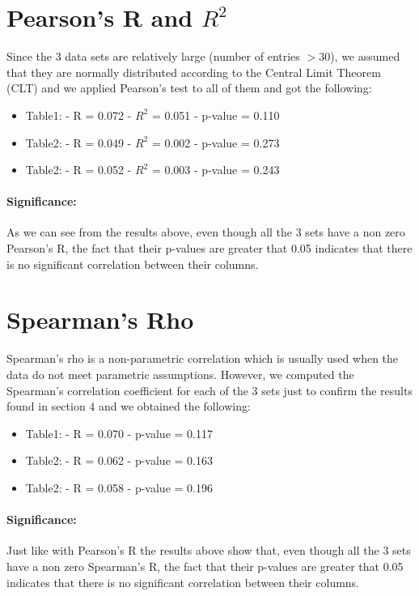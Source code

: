 \documentclass[12pt]{article}
\begin{document}
	\section{Pearson's R and $R^2$}
		Since the 3 data sets are relatively large (number of entries $> 30$), we assumed that they are normally distributed according to the Central Limit Theorem (CLT) and we applied Pearson's test to all of them and got the following:
		\begin{itemize} 
			\item Table1: 
				\subitem - R = 0.072
				\subitem - $R^2$ = 0.051
				\subitem - p-value = 0.110
			\item Table2:
				\subitem - R = 0.049 
				\subitem - $R^2$ = 0.002
				\subitem - p-value = 0.273
			\item Table2:
				\subitem - R = 0.052
				\subitem - $R^2$ = 0.003
				\subitem - p-value = 0.243
		\end{itemize} 
		
		\paragraph{Significance:}
			As we can see from the results above, even though all the 3 sets have a non zero Pearson's R, the fact that their p-values are greater that 0.05 indicates that there is no significant correlation between their columns. 
	
	\section{Spearman's Rho}
		Spearman's rho is a non-parametric correlation which is usually used when the data do not meet parametric assumptions. However, we computed the Spearman's correlation coefficient for each of the 3 sets just to confirm  the results found in section 4 and we obtained the following:
		\begin{itemize}
			\item Table1: 
			\subitem - R = 0.070
			\subitem - p-value = 0.117
			\item Table2:
			\subitem - R = 0.062 
			\subitem - p-value = 0.163
			\item Table2:
			\subitem - R = 0.058
			\subitem - p-value = 0.196
		\end{itemize}
		\paragraph{Significance:}
		Just like with Pearson's R the results above show that, even though all the 3 sets have a non zero Spearman's R, the fact that their p-values are greater that 0.05 indicates that there is no significant correlation between their columns.
	
\end{document}

